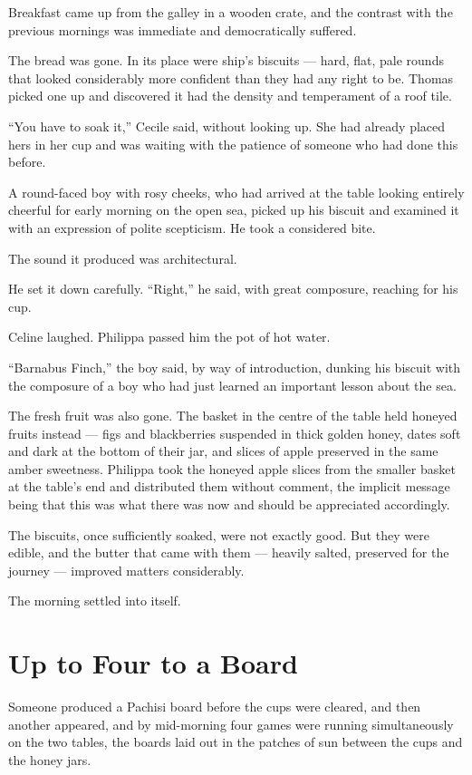 Breakfast came up from the galley in a wooden crate, and the contrast with the previous mornings was immediate and democratically suffered.

The bread was gone. In its place were ship's biscuits --- hard, flat, pale rounds that looked considerably more confident than they had any right to be. Thomas picked one up and discovered it had the density and temperament of a roof tile.

\enquote{You have to soak it,} Cecile said, without looking up. She had already placed hers in her cup and was waiting with the patience of someone who had done this before.

A round-faced boy with rosy cheeks, who had arrived at the table looking entirely cheerful for early morning on the open sea, picked up his biscuit and examined it with an expression of polite scepticism. He took a considered bite.

The sound it produced was architectural.

He set it down carefully. \enquote{Right,} he said, with great composure, reaching for his cup.

Celine laughed. Philippa passed him the pot of hot water.

\enquote{Barnabus Finch,} the boy said, by way of introduction, dunking his biscuit with the composure of a boy who had just learned an important lesson about the sea.

The fresh fruit was also gone. The basket in the centre of the table held honeyed fruits instead --- figs and blackberries suspended in thick golden honey, dates soft and dark at the bottom of their jar, and slices of apple preserved in the same amber sweetness. Philippa took the honeyed apple slices from the smaller basket at the table's end and distributed them without comment, the implicit message being that this was what there was now and should be appreciated accordingly.

The biscuits, once sufficiently soaked, were not exactly good. But they were edible, and the butter that came with them --- heavily salted, preserved for the journey --- improved matters considerably.

The morning settled into itself.

\section*{Up to Four to a Board}

Someone produced a Pachisi board before the cups were cleared, and then another appeared, and by mid-morning four games were running simultaneously on the two tables, the boards laid out in the patches of sun between the cups and the honey jars.

